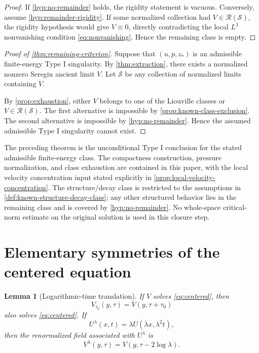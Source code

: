 \documentclass[11pt]{amsart}
\theoremstyle{plain}
\newtheorem{lemma}[theorem]{Lemma}
\theoremstyle{definition}
\theoremstyle{remark}
\numberwithin{equation}{section}
\newcommand{\calS}{\mathcal S}
\newcommand{\calR}{\mathcal R}
\begin{document}
\begin{proof}
If \cref{hyp:no-remainder} holds, the rigidity statement is vacuous.
Conversely, assume \cref{hyp:remainder-rigidity}.  If some normalized
collection had \(V\in\calR(\calS)\), the rigidity hypothesis would give
\(V\equiv0\), directly contradicting the local \(L^3\) nonvanishing condition
\eqref{eq:nonvanishing}.  Hence the remaining class is empty.
\end{proof}

\begin{proof}[Proof of \cref{thm:remaining-criterion}]
Suppose that \((u,p,z_*)\) is an admissible finite-energy Type I singularity.
By \cref{thm:extraction}, there exists a normalized nonzero Seregin ancient
limit \(V\).  Let \(\calS\) be any collection of normalized limits containing
\(V\).

By \cref{prop:exhaustion}, either \(V\) belongs to one of the Liouville classes
or \(V\in\calR(\calS)\).  The first alternative is impossible by
\cref{prop:known-class-exclusion}.  The second alternative is impossible by
\cref{hyp:no-remainder}.  Hence the assumed admissible Type I singularity
cannot exist.
\end{proof}

The preceding theorem is the unconditional Type I conclusion for the stated
admissible finite-energy class.  The compactness construction, pressure
normalization, and class exhaustion are contained in this paper, with the local
velocity concentration input stated explicitly in
\cref{prop:local-velocity-concentration}.  The structure/decay class is
restricted to the assumptions in \cref{def:known-structure-decay-class}; any
other structured behavior lies in the remaining class and is covered by
\cref{hyp:no-remainder}.  No whole-space critical-norm estimate on the
original solution is used in this closure step.

\appendix

\section{Elementary symmetries of the centered equation}
\label{app:centered-symmetries}

\begin{lemma}[Logarithmic-time translation]\label{lem:tau-translation}
If \(V\) solves \eqref{eq:centered}, then
\[
   V_{\tau_0}(y,\tau)=V(y,\tau+\tau_0)
\]
also solves \eqref{eq:centered}.  If
\[
   U^\lambda(x,t)=\lambda U(\lambda x,\lambda^2t),
\]
then the renormalized field associated with \(U^\lambda\) is
\[
   V^\lambda(y,\tau)=V(y,\tau-2\log\lambda).
\]
\end{lemma}
\end{document}
